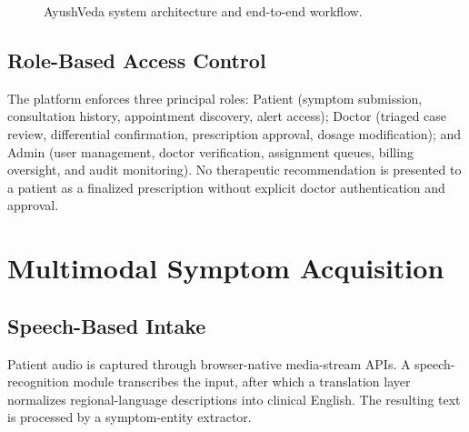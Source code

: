 \documentclass[conference]{IEEEtran}
\begin{document}
\begin{figure}[htbp]
\centering
{}
\caption{AyushVeda system architecture and end-to-end workflow.}
\label{fig:architecture}
\end{figure}

\subsection{Role-Based Access Control}
The platform enforces three principal roles: Patient (symptom submission, consultation history, appointment discovery, alert access); Doctor (triaged case review, differential confirmation, prescription approval, dosage modification); and Admin (user management, doctor verification, assignment queues, billing oversight, and audit monitoring). No therapeutic recommendation is presented to a patient as a finalized prescription without explicit doctor authentication and approval.

\section{Multimodal Symptom Acquisition}

\subsection{Speech-Based Intake}
Patient audio is captured through browser-native media-stream APIs. A speech-recognition module transcribes the input, after which a translation layer normalizes regional-language descriptions into clinical English. The resulting text is processed by a symptom-entity extractor.
\end{document}
